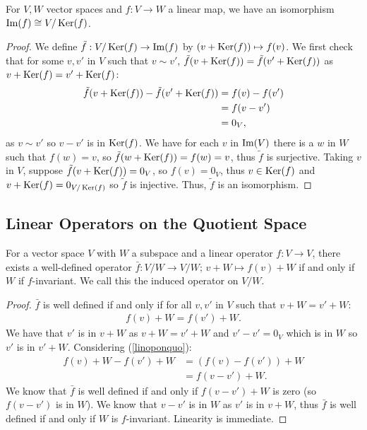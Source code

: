 For $V, W$ vector spaces and $f : V \to W$ a linear map, we have
an isomorphism $\operatorname{Im}(f) \cong V/\operatorname{Ker}(f)$.
\begin{proof}
  We define $\tilde{f} : V/\operatorname{Ker}(f) \to \operatorname{Im}(f)$ by $(v + \operatorname{Ker}(f)) \mapsto f(v)$.
  We first check that for some $v, v'$ in $V$ such that $v \sim v'$,
  $\tilde{f}(v + \operatorname{Ker}(f)) = \tilde{f}(v' + \operatorname{Ker}(f))$ as 
  $v + \operatorname{Ker}(f) = v' + \operatorname{Ker}(f)$: \begin{align*}
    \tilde{f}(v + \operatorname{Ker}(f)) - \tilde{f}(v' + \operatorname{Ker}(f)) &= f(v) - f(v') \\
    &= f(v - v') \\
    &= 0_V,
  \end{align*} as $v \sim v'$ so $v - v'$ is in $\operatorname{Ker}(f)$.
  We have for each $v$ in $\operatorname{Im}(V)$ there is a $w$ in $W$ such that $f(w) = v$,
  so $\tilde{f}(w + \operatorname{Ker}(f)) = f(w) = v$, thus $\tilde{f}$ is surjective. 
  Taking $v$ in $V$, suppose $\tilde{f}(v + \operatorname{Ker}(f)) = 0_V$,
  so $f(v) = 0_V$, thus $v \in \operatorname{Ker}(f)$ and \newline
  $v + \operatorname{Ker}(f) = 0_{V/\operatorname{Ker}(f)}$
  so $\tilde{f}$ is injective. Thus, $\tilde{f}$ is an isomorphism.
\end{proof}

\subsection{Linear Operators on the Quotient Space}

For a vector space $V$ with $W$ a subspace and a linear
operator $f : V \to V$, there exists a well-defined operator
$\bar{f} : V/W \to V/W; \, v + W \mapsto f(v) + W$ if and only if 
$W$ if $f$-invariant. We call this the induced operator on $V/W$.
\begin{proof}
  $\bar{f}$ is well defined if and only if for all $v, v'$ in $V$
  such that $v + W = v' + W$: \begin{gather} \label{linoponquo}
    f(v) + W = f(v') + W.
  \end{gather} We have that $v'$ is in $v + W$ as $v + W = v' + W$
  and $v' - v' = 0_V$ which is in $W$ so $v'$ is in $v' + W$. 
  Considering (\ref{linoponquo}): \begin{align*}
    f(v) + W - f(v') + W &= (f(v) - f(v')) + W \\
    &= f(v - v') + W.
  \end{align*} We know that $\bar{f}$ is well defined if and only if
  $f(v - v') + W$ is zero (so $f(v - v')$ is in $W$). We know that
  $v - v'$ is in $W$ as $v'$ is in $v + W$, thus $\bar{f}$ is well defined 
  if and only if $W$ is $f$-invariant. Linearity is immediate.
\end{proof}

